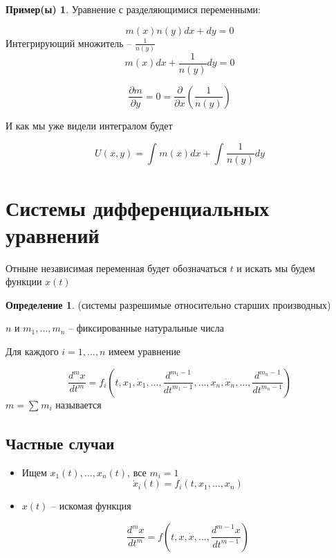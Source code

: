 \documentclass[a4paper]{article}
\theoremstyle{indented}
\theoremstyle{definition}
\newtheorem*{defn}{Определение}
\newtheorem*{exl}{Пример(ы)}
\theoremstyle{remark}
\begin{document}
\begin{exl}
  Уравнение с разделяющимися переменными:

  \[m(x)n(y) dx + dy = 0\]
  Интегрирующий множитель -- $\frac{1}{n(y)}$
  \[m(x)dx + \frac{1}{n(y)} dy = 0\]

  \[ \frac{\partial m}{\partial y} = 0 = \frac{\partial }{\partial x}(\frac{1}{n(y)})\]

  И как мы уже видели интегралом будет

  \[U(x,y) = \int_{}^{}m(x) dx + \int_{}^{}\frac{1}{n(y)} dy \]
\end{exl}
  
\section{Системы дифференциальных уравнений}

Отныне независимая переменная будет обозначаться $t$ и искать мы будем функции $x(t)$

\begin{defn}
   (системы разрешимые относительно старших производных)

  $n$ и $m_1, \ldots , m_n$ -- фиксированные натуральные числа

  Для каждого $i = 1,\ldots, n$ имеем уравнение

  \[\frac{d^mx}{dt^m} = f_i(t,x_1, \dot x_1, \ldots, \frac{d^{m_1-1}}{dt^{m_1-1}}, \ldots , x_n, \dot x_n, \ldots, \frac{d^{m_n-1}}{dt^{m_n-1}})  \]
  $m = \sum_{}^{}m_i$ называется 
\end{defn}

\subsection{Частные случаи}

\begin{itemize}
\item {}
  Ищем $x_1(t), \ldots, x_n(t)$, все $m_i = 1$
  \begin{equation*}
      \dot x_i(t) = f_i(t,x_1, \ldots ,x_n)
  \end{equation*}


\item {}
  $x(t)$ -- искомая функция

  \[\frac{d^mx}{dt^m} = f(t,x, \dot x, \ldots, \frac{d^{m-1}x}{dt^{m-1}})\]
\end{itemize}
\end{document}
